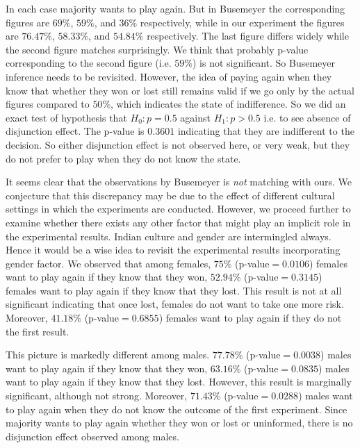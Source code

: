 \documentclass[review]{elsarticle}
\begin{document}
In each case majority wants to play again. But in Busemeyer the corresponding figures are $69\%$, $59\%$, and $36\%$ respectively, while in our experiment the figures are $76.47\%$, $58.33\%$, and $54.84\%$ respectively. The last figure differs widely while the second figure matches surprisingly. We think that probably p-value corresponding to the second figure (i.e. $59\%$) is not significant. So Busemeyer inference needs to be revisited. However, the idea of paying again when they know that whether they won or lost still remains valid if we go only by the actual figures compared to $50\%$, which indicates the state of indifference. So we did an exact test of hypothesis that $H_0: p=0.5$ against $H_1: p>0.5$ i.e. to see absence of disjunction effect. The p-value is $0.3601$ indicating that they are indifferent to the decision. So either disjunction effect is not observed here, or very weak, but they do not prefer to play when they do not know the state.



 It seems clear that the observations by Busemeyer is {\it{not}} matching with ours. We conjecture that this discrepancy may be due to the effect of different cultural settings in which the experiments are conducted. However, we proceed further to examine whether there exists any other factor that might play an implicit role in the experimental results. Indian culture and gender are intermingled always. Hence it would be a wise idea to revisit the experimental results incorporating gender factor. We observed that among females, $75\%$ (p-value$=0.0106$) females want to play again if they know that they won, $52.94\%$ (p-value$=0.3145$) females want to play again if they know that they lost. This result is not at all significant indicating that once lost, females do not want to take one more risk. Moreover, $41.18\%$ (p-value$=0.6855$) females want to play again if they do not the first result.

This picture is markedly different among males. $77.78\%$ (p-value$=0.0038$) males want to play again if they know that they won, $63.16\%$ (p-value$=0.0835$) males want to play again if they know that they lost. However, this result is marginally significant, although not strong. Moreover, $71.43\%$ (p-value$=0.0288$) males want to play again when they do not know the outcome of the first experiment. Since majority wants to play again whether they won or lost or uninformed, there is no disjunction effect observed among males. 
\end{document}
